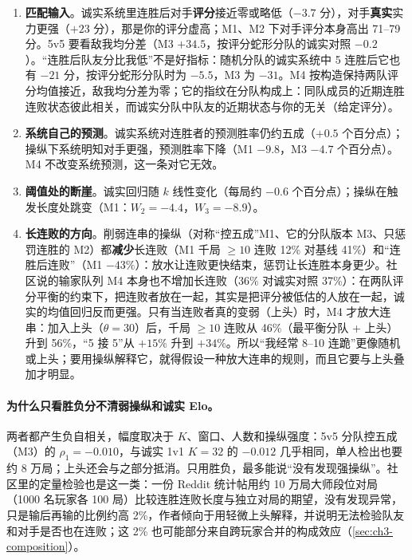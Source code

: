 \begin{enumerate}
\item \textbf{匹配输入}。诚实系统里连胜后对手\textbf{评分}接近零或略低（$-3.7$ 分），对手\textbf{真实}实力更强（$+23$ 分），那是你的评分虚高；M1、M2 下对手评分本身高出 71–79 分。5v5 要看敌我均分差（M3 $+34.5$，按评分蛇形分队的诚实对照 $-0.2$）。“连胜后队友分比我低”不是好指标：随机分队的诚实系统中 5 连胜后它也有 $-21$ 分，按评分蛇形分队时为 $-5.5$，M3 为 $-31$。M4 按构造保持两队评分均值接近，敌我均分差为零；它的指纹在分队构成上：同队成员的近期连胜连败状态彼此相关，而诚实分队中队友的近期状态与你的无关（给定评分）。
\item \textbf{系统自己的预测}。诚实系统对连胜者的预测胜率仍约五成（$+0.5$ 个百分点）；操纵下系统明知对手更强，预测胜率下降（M1 $-9.8$，M3 $-4.7$ 个百分点）。M4 不改变系统预测，这一条对它无效。
\item \textbf{阈值处的断崖}。诚实回归随 $k$ 线性变化（每局约 $-0.6$ 个百分点）；操纵在触发长度处跳变（M1：$W_2=-4.4$，$W_3=-8.9$）。
\item \textbf{长连败的方向}。削弱连串的操纵（对称“控五成”M1、它的分队版本 M3、只惩罚连胜的 M2）都\textbf{减少}长连败（M1 千局 $\ge10$ 连败 12\% 对基线 41\%）和“连胜后连败”（M1 $-43\%$）：放水让连败更快结束，惩罚让长连胜本身更少。社区说的输家队列 M4 本身也不增加长连败（36\% 对诚实对照 37\%）：在两队评分平衡的约束下，把连败者放在一起，其实是把评分被低估的人放在一起，诚实的均值回归反而更强。只有当连败者真的变弱（上头）时，M4 才放大连串：加入上头（$\theta=30$）后，千局 $\ge10$ 连败从 46\%（最平衡分队 + 上头）升到 56\%，“5 接 5”从 $+15\%$ 升到 $+34\%$。所以“我经常 8–10 连跪”更像随机或上头；要用操纵解释它，就得假设一种放大连串的规则，而且它要与上头叠加才明显。
\end{enumerate}

\paragraph{为什么只看胜负分不清弱操纵和诚实 Elo。} 两者都产生负自相关，幅度取决于 $K$、窗口、人数和操纵强度：5v5 分队控五成（M3）的 $\rho_1=-0.010$，与诚实 1v1 $K=32$ 的 $-0.012$ 几乎相同，单人检出也要约 8 万局；上头还会与之部分抵消。只用胜负，最多能说“没有发现强操纵”。社区里的定量检验也是这一类：一份 Reddit 统计帖用约 10 万局大师段位对局（1000 名玩家各 100 局）比较连胜连败长度与独立对局的期望，没有发现异常，只是输后再输的比例约高 2\%，作者倾向于用轻微上头解释，并说明无法检验队友和对手是否也在连败\cite{renecotyfanboy2023existence}\tagCom；这 2\% 也可能部分来自跨玩家合并的构成效应（\cref{sec:ch3-composition}）。

